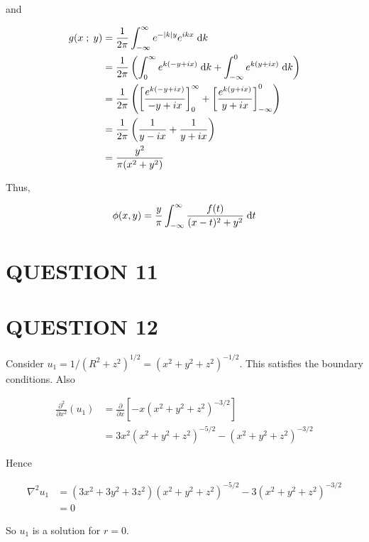 \documentclass[a4paper]{article}
\begin{document}
\begin{enumerate}
	and 
	
	\begin{align*}
	g( x \; ; \; y) &  = \frac{1}{2 \pi} \int_{-\infty}^{\infty} e^{-| k |y} e^{ikx} \; \mathrm{d} k \\
	& =  \frac{1}{2 \pi} \left( \int_{0}^{\infty} e^{k(-y + ix)} \; \mathrm{d} k  + \int_{-\infty}^{0} e^{k(y + ix)} \; \mathrm{d} k    \right)  \\
	& = \frac{1}{2 \pi} \left(  \left[  \frac{e^{k(-y + ix)}}{-y + ix} \right]_{0}^{\infty} + \left[  \frac{e^{k(y + ix)}}{y + ix} \right]_{-\infty}^{0}   \right) \\
	& = \frac{1}{2\pi} \left(   \frac{1}{y - ix} + \frac{1}{y + ix} \right) \\
	& = \frac{y^{2}}{\pi(x^{2} + y^{2})}
	\end{align*}
	
	Thus, 
	
	\[ \phi(x,y) = \frac{y}{\pi} \int_{-\infty}^{\infty} \frac{f(t)}{(x - t)^{2} + y^{2} } \; \mathrm{d} t \]

	
\end{enumerate}




\section{QUESTION 11}

\section{QUESTION 12}

Consider $ u_{1} = 1/(R^{2} + z^{2})^{1/2} = (x^{2} + y^{2} + z^{2})^{-1/2} $.
This satisfies the boundary conditions. Also


\begin{align*}
\frac{\partial^{2} }{\partial x^{2}} (u_{1}) & = \frac{\partial }{\partial x} \left[ - x (x^{2} + y^{2} + z^{2})^{-3/2}   \right]  \\
& = 3x^{2} (x^{2} + y^{2} + z^{2})^{-5/2} - (x^{2} + y^{2} + z^{2})^{-3/2} 
\end{align*}

Hence 

\begin{align*}
\nabla^{2} u_{1} & = (3x^{2} + 3y^{2} + 3z^{2})(x^{2} + y^{2} + z^{2})^{-5/2} - 3 (x^{2} + y^{2} + z^{2})^{-3/2} \\
& = 0
\end{align*}

So $ u_{1} $ is a solution for $ r = 0 $.
\end{document}
